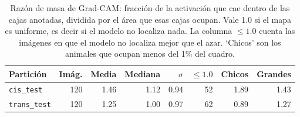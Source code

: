 \begin{table}[t]
  \centering
  \small
  \begin{tabular}{lrrrrrrr}
    \toprule
    Partición & Imág. & Media & Mediana & $\sigma$ & $\leq 1.0$ & Chicos & Grandes \\
    \midrule
    \texttt{cis\_test} & 120 & 1.46 & 1.12 & 0.94 & 52 & 1.89 & 1.43 \\
    \texttt{trans\_test} & 120 & 1.25 & 1.00 & 0.97 & 62 & 0.89 & 1.27 \\
    \bottomrule
  \end{tabular}
  \caption{Razón de masa de Grad-CAM: fracción de la activación que cae dentro de las cajas anotadas, dividida por el área que esas cajas ocupan. Vale 1.0 si el mapa es uniforme, es decir si el modelo no localiza nada. La columna $\leq 1.0$ cuenta las imágenes en que el modelo no localiza mejor que el azar. `Chicos' son los animales que ocupan menos del 1\% del cuadro.}
  \label{tab:gradcam}
\end{table}
